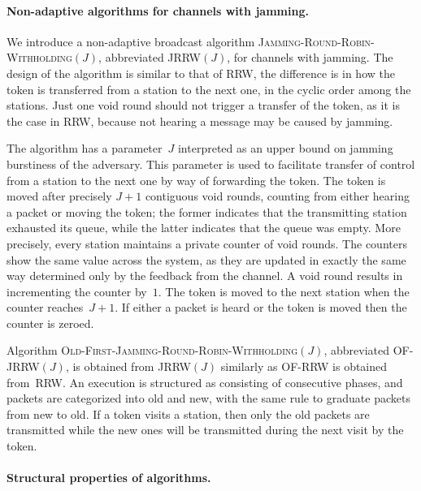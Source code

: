 \documentclass[11pt]{article}
\newcommand{\BBB}{\vspace*{-\bigskipamount}}
\newcommand{\Paragraph}[1]{\BBB\paragraph{#1}}
\begin{document}

\Paragraph{Non-adaptive algorithms for channels with jamming.}




We introduce a non-adaptive broadcast algorithm \textsc{Jamming-Round-Robin-Withholding}$(J)$, abbreviated  \textsc{JRRW$(J)$}, for channels with jamming.
The design of the algorithm is similar to that of \textsc{RRW}, the difference is in how the  token is transferred from a station to the next one, in the cyclic order among the stations.
Just one void round should not trigger a transfer of the token, as it is the case in \textsc{RRW},  because not hearing a message may be caused by jamming.

The algorithm has a parameter~$J$ interpreted as an upper bound on jamming burstiness of the adversary.
This parameter is used to facilitate transfer of  control from a station to the next one  by way of forwarding the token.
The token is moved after precisely $J+1$ contiguous void rounds, counting from either hearing a packet or moving the token; the former indicates that the transmitting station exhausted its queue, while the latter indicates that the queue was empty.
More precisely, every station maintains a private counter of void rounds. 
The counters show the same value across the system, as they are updated in exactly the same way  determined only by the feedback from the channel.
A void round results in incrementing the counter by~$1$. 
The token is moved to the next station when the counter reaches~$J+1$.
If either a packet is heard or the token is moved then the counter is zeroed.

Algorithm \textsc{Old-First-Jamming-Round-Robin-Withholding}$(J)$, abbreviated \textsc{OF-JRRW$(J)$}, is obtained from \textsc{JRRW$(J)$} similarly as \textsc{OF-RRW} is obtained from~\textsc{RRW}.
An execution is structured as consisting of consecutive phases, and packets are categorized into old and new, with the same rule to graduate packets from new to old.
If a token visits a station, then only the old packets are transmitted while the new ones will be transmitted during the next visit by the token.




\Paragraph{Structural properties of algorithms.}
\end{document}
